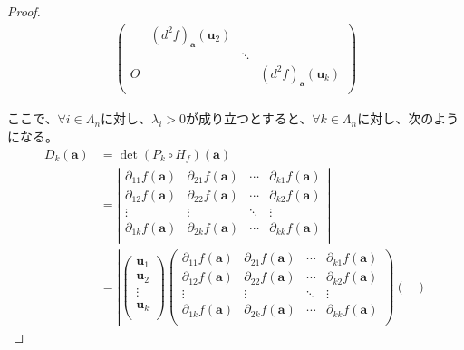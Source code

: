 \documentclass[dvipdfmx]{jsarticle}
\begin{document}
\begin{proof}
\begin{align*}
\begin{pmatrix}
\  & \left( d^{2}f \right)_{\mathbf{a}}\left( \mathbf{u}_{2} \right) & \  & \  \\
\  & \  & \ddots & \  \\
O & \  & \  & \left( d^{2}f \right)_{\mathbf{a}}\left( \mathbf{u}_{k} \right) \\
\end{pmatrix}
\end{align*}\par
ここで、$\forall i \in \varLambda_{n}$に対し、$\lambda_{i} > 0$が成り立つとすると、$\forall k \in \varLambda_{n}$に対し、次のようになる。
\begin{align*}
D_{k}\left( \mathbf{a} \right) &= \det\left( P_{k} \circ H_{f} \right)\left( \mathbf{a} \right)\\
&= \left| \begin{matrix}
\partial_{11}f\left( \mathbf{a} \right) & \partial_{21}f\left( \mathbf{a} \right) & \cdots & \partial_{k1}f\left( \mathbf{a} \right) \\
\partial_{12}f\left( \mathbf{a} \right) & \partial_{22}f\left( \mathbf{a} \right) & \cdots & \partial_{k2}f\left( \mathbf{a} \right) \\
 \vdots & \vdots & \ddots & \vdots \\
\partial_{1k}f\left( \mathbf{a} \right) & \partial_{2k}f\left( \mathbf{a} \right) & \cdots & \partial_{kk}f\left( \mathbf{a} \right) \\
\end{matrix} \right|\\
&= \left| \begin{pmatrix}
\mathbf{u}_{1} \\
\mathbf{u}_{2} \\
 \vdots \\
\mathbf{u}_{k} \\
\end{pmatrix}\begin{pmatrix}
\partial_{11}f\left( \mathbf{a} \right) & \partial_{21}f\left( \mathbf{a} \right) & \cdots & \partial_{k1}f\left( \mathbf{a} \right) \\
\partial_{12}f\left( \mathbf{a} \right) & \partial_{22}f\left( \mathbf{a} \right) & \cdots & \partial_{k2}f\left( \mathbf{a} \right) \\
 \vdots & \vdots & \ddots & \vdots \\
\partial_{1k}f\left( \mathbf{a} \right) & \partial_{2k}f\left( \mathbf{a} \right) & \cdots & \partial_{kk}f\left( \mathbf{a} \right) \\
\end{pmatrix}\begin{pmatrix}

\end{pmatrix}
\end{align*}
\end{proof}
\end{document}
